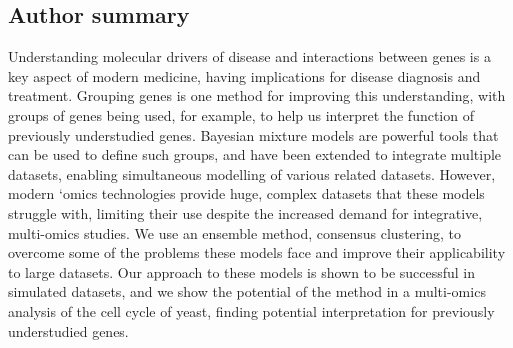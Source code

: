 \documentclass[12pt]{article}
\begin{document}
%

\subsection*{Author summary}
Understanding molecular drivers of disease and interactions between genes is a key aspect of modern medicine, having implications for disease diagnosis and treatment. Grouping genes is one method for improving this understanding, with groups of genes being used, for example, to help us interpret the function of previously understudied genes. Bayesian mixture models are powerful tools that can be used to define such groups, and have been extended to integrate multiple datasets, enabling simultaneous modelling of various related datasets. However, modern ‘omics technologies provide huge, complex datasets that these models struggle with, limiting their use despite the increased demand for integrative, multi-omics studies. We use an ensemble method, consensus clustering, to overcome some of the problems these models face and improve their applicability to large datasets. Our approach to these models is shown to be successful in simulated datasets, and we show the potential of the method in a multi-omics analysis of the cell cycle of yeast, finding potential interpretation for previously understudied genes.
\end{document}
